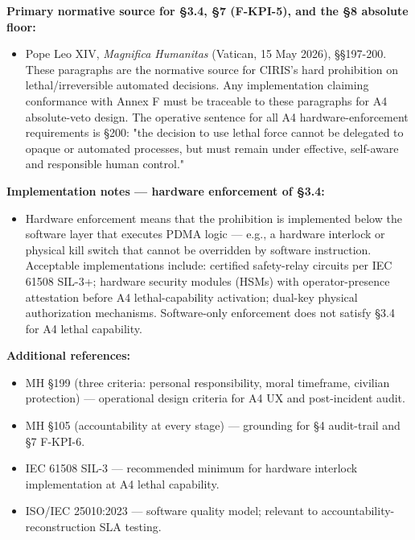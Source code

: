 \documentclass[11pt]{article}
\begin{document}
\textbf{Primary normative source for §3.4, §7 (F-KPI-5), and the §8 absolute floor:}


\begin{itemize}\setlength\itemsep{0pt}
\item Pope Leo XIV, \textit{Magnifica Humanitas} (Vatican, 15 May 2026), §§197-200. These paragraphs are the normative source for CIRIS's hard prohibition on lethal/irreversible automated decisions. Any implementation claiming conformance with Annex F must be traceable to these paragraphs for A4 absolute-veto design. The operative sentence for all A4 hardware-enforcement requirements is §200: "the decision to use lethal force cannot be delegated to opaque or automated processes, but must remain under effective, self-aware and responsible human control."
\end{itemize}


\textbf{Implementation notes — hardware enforcement of §3.4:}


\begin{itemize}\setlength\itemsep{0pt}
\item Hardware enforcement means that the prohibition is implemented below the software layer that executes PDMA logic — e.g., a hardware interlock or physical kill switch that cannot be overridden by software instruction. Acceptable implementations include: certified safety-relay circuits per IEC 61508 SIL-3+; hardware security modules (HSMs) with operator-presence attestation before A4 lethal-capability activation; dual-key physical authorization mechanisms. Software-only enforcement does not satisfy §3.4 for A4 lethal capability.
\end{itemize}


\textbf{Additional references:}


\begin{itemize}\setlength\itemsep{0pt}
\item MH §199 (three criteria: personal responsibility, moral timeframe, civilian protection) — operational design criteria for A4 UX and post-incident audit.
\item MH §105 (accountability at every stage) — grounding for §4 audit-trail and §7 F-KPI-6.
\item IEC 61508 SIL-3 — recommended minimum for hardware interlock implementation at A4 lethal capability.
\item ISO/IEC 25010:2023 — software quality model; relevant to accountability-reconstruction SLA testing.
\end{itemize}
\end{document}

